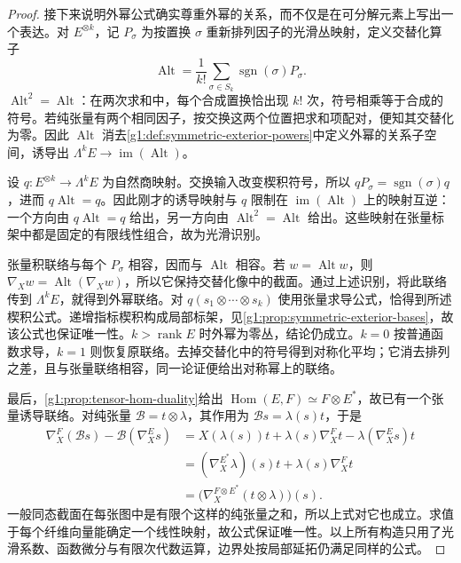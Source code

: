 \begin{proof}
	接下来说明外幂公式确实尊重外幂的关系，而不仅是在可分解元素上写出一个表达。对 \(E^{\otimes k}\)，记 \(P_\sigma\) 为按置换 \(\sigma\) 重新排列因子的光滑丛映射，定义交替化算子
	\[
		\operatorname{Alt}=\frac1{k!}\sum_{\sigma\in S_k}\operatorname{sgn}(\sigma)P_\sigma.
	\]
	\(\operatorname{Alt}^2=\operatorname{Alt}\)：在两次求和中，每个合成置换恰出现 \(k!\) 次，符号相乘等于合成的符号。若纯张量有两个相同因子，按交换这两个位置把求和项配对，便知其交替化为零。因此 \(\operatorname{Alt}\) 消去\cref{g1:def:symmetric-exterior-powers}中定义外幂的关系子空间，诱导出 \(\Lambda^kE\to\operatorname{im}(\operatorname{Alt})\)。

	设 \(q:E^{\otimes k}\to\Lambda^kE\) 为自然商映射。交换输入改变楔积符号，所以 \(qP_\sigma=\operatorname{sgn}(\sigma)q\)，进而 \(q\operatorname{Alt}=q\)。因此刚才的诱导映射与 \(q\) 限制在 \(\operatorname{im}(\operatorname{Alt})\) 上的映射互逆：一个方向由 \(q\operatorname{Alt}=q\) 给出，另一方向由 \(\operatorname{Alt}^2=\operatorname{Alt}\) 给出。这些映射在张量标架中都是固定的有限线性组合，故为光滑识别。

	张量积联络与每个 \(P_\sigma\) 相容，因而与 \(\operatorname{Alt}\) 相容。若 \(w=\operatorname{Alt}w\)，则 \(\nabla_Xw=\operatorname{Alt}(\nabla_Xw)\)，所以它保持交替化像中的截面。通过上述识别，将此联络传到 \(\Lambda^kE\)，就得到外幂联络。对 \(q(s_1\otimes\cdots\otimes s_k)\) 使用张量求导公式，恰得到所述楔积公式。递增指标楔积构成局部标架，见\cref{g1:prop:symmetric-exterior-bases}，故该公式也保证唯一性。\(k>\operatorname{rank}E\) 时外幂为零丛，结论仍成立。\(k=0\) 按普通函数求导，\(k=1\) 则恢复原联络。去掉交替化中的符号得到对称化平均；它消去排列之差，且与张量联络相容，同一论证便给出对称幂上的联络。

	最后，\cref{g1:prop:tensor-hom-duality}给出 \(\operatorname{Hom}(E,F)\simeq F\otimes E^*\)，故已有一个张量诱导联络。对纯张量 \(\mathcal B=t\otimes\lambda\)，其作用为 \(\mathcal B s=\lambda(s)t\)，于是
	\begin{align*}
		\nabla^F_X(\mathcal B s)-\mathcal B(\nabla^E_Xs)
		&=X(\lambda(s))t+\lambda(s)\nabla^F_Xt-\lambda(\nabla^E_Xs)t\\
		&=(\nabla^{E^*}_X\lambda)(s)t+\lambda(s)\nabla^F_Xt\\
		&=\bigl(\nabla_X^{F\otimes E^*}(t\otimes\lambda)\bigr)(s).
	\end{align*}
	一般同态截面在每张图中是有限个这样的纯张量之和，所以上式对它也成立。求值于每个纤维向量能确定一个线性映射，故公式保证唯一性。以上所有构造只用了光滑系数、函数微分与有限次代数运算，边界处按局部延拓仍满足同样的公式。
\end{proof}

